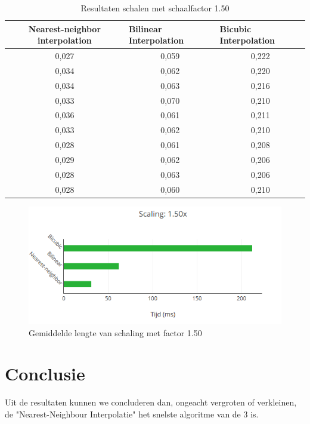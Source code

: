 \documentclass{article}
\begin{document}
\begin{table}[H]
    \centering
    \begin{tabular}{ccc}
        \toprule
            Nearest-neighbor interpolation & \multicolumn{1}{l}{Bilinear Interpolation} &\multicolumn{1}{l}{Bicubic Interpolation} \\
        \midrule
            0,027 & 0,059 & 0,222 \\
            0,034 & 0,062 & 0,220 \\
            0,034 & 0,063 & 0,216 \\
            0,033 & 0,070 & 0,210 \\
            0,036 & 0,061 & 0,211 \\
            0,033 & 0,062 & 0,210 \\
            0,028 & 0,061 & 0,208 \\
            0,029 & 0,062 & 0,206 \\
            0,028 & 0,063 & 0,206 \\
            0,028 & 0,060 & 0,210 \\
    \end{tabular}
        \caption{Resultaten schalen met schaalfactor 1.50}
\end{table}

\begin{figure}[H]
    \centering
    \includegraphics[width=12cm]{graphs/Scaling_150.PNG}
    \caption{Gemiddelde lengte van schaling met factor 1.50}
    \label{fig:my_label}
\end{figure}

\section{Conclusie}
Uit de resultaten kunnen we concluderen dan, ongeacht vergroten of verkleinen, de "Nearest-Neighbour Interpolatie" het snelste algoritme van de 3 is. 
\end{document}
